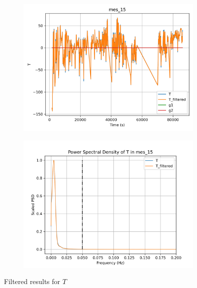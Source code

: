 \begin{figure}[H]

\begin{minipage}{0.49\textwidth}
        \begin{figure}[H]
                \centering
                \includegraphics[width = \textwidth]{./figs/trk_filt/mes_15/T.png}
        \end{figure}
\end{minipage}
\begin{minipage}{0.49\textwidth}
        \begin{figure}[H]
                \centering
                \includegraphics[width = \textwidth]{./figs/trk_filt/mes_15/T_psd.png}
        \end{figure}
\end{minipage}
\caption{Filtered results for $T$}

\end{figure}


